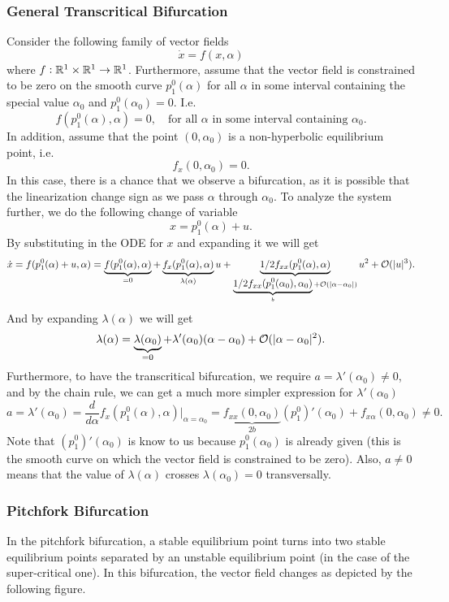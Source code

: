 \subsubsection*{General Transcritical Bifurcation}
Consider the following family of vector fields
\[ \dot{x} = f(x,\alpha) \]
where $f:\mathbb{R}^1 \times \mathbb{R}^1 \to \mathbb{R}^1$. Furthermore, assume that the vector field is constrained to be zero on the smooth curve $p^0_1(\alpha)$ for all $\alpha$ in some interval containing the special value $\alpha_0$ and $p_1^0(\alpha_0) = 0$. I.e.
\[ f(p_1^0(\alpha),\alpha) = 0, \quad \text{for all $\alpha$ in some interval containing $\alpha_0$}. \]
In addition, assume that the point $(0,\alpha_0)$ is a non-hyperbolic equilibrium point, i.e.
\[ f_x(0,\alpha_0) = 0. \]
In this case, there is a chance that we observe a bifurcation, as it is possible that the linearization change sign as we pass $\alpha$ through $\alpha_0$. To analyze the system further, we do the following change of variable
\[ x = p^0_1(\alpha) + u. \]
By substituting in the ODE for $x$ and expanding it we will get
\[ \dot{x} = f(p^0_1(\alpha)+u,\alpha) = \underbrace{f(p^0_1(\alpha),\alpha)}_{=0} + \underbrace{f_x(p^0_1(\alpha),\alpha)}_{\lambda(\alpha)}u + \underbrace{1/2f_{xx}(p^0_1(\alpha),\alpha)}_{\underbrace{1/2f_{xx}(p^0_1(\alpha_0),\alpha_0)}_b + \mathcal{O}(|\alpha-\alpha_0|)} u^2 + \mathcal{O}(|u|^3). \]
And by expanding $\lambda(\alpha)$ we will get
\[ \lambda(\alpha) = \underbrace{\lambda(\alpha_0)}_{=0} + \lambda'(\alpha_0)(\alpha-\alpha_0) + \mathcal{O}(|\alpha-\alpha_0|^2). \]
Furthermore, to have the transcritical bifurcation, we require $a = \lambda'(\alpha_0)  \neq 0$, and by the chain rule, we can get a much more simpler expression for $\lambda'(\alpha_0)$
\[ a = \lambda'(\alpha_0)  = \frac{d}{d\alpha} f_x(p^0_1(\alpha),\alpha) \big|_{\alpha=\alpha_0} = \underbrace{f_{xx}(0,\alpha_0)}_{2b}(p_1^0)'(\alpha_0) + f_{x\alpha}(0,\alpha_0) \neq 0.  \]
Note that $(p^0_1)'(\alpha_0)$ is know to us because $p^0_1(\alpha_0)$ is already given (this is the smooth curve on which the vector field is constrained to be zero). Also, $a\neq0$ means that the value of $\lambda(\alpha)$ crosses $\lambda(\alpha_0) = 0$ transversally.


\subsubsection{Pitchfork Bifurcation}
In the pitchfork bifurcation, a stable equilibrium point turns into two stable equilibrium points separated by an unstable equilibrium point (in the case of the super-critical one). In this bifurcation, the vector field changes as depicted by the following figure.



